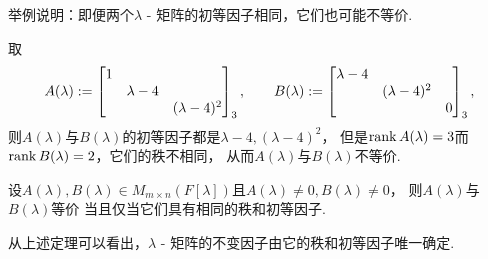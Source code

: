 \begin{example}
举例说明：即便两个\(\lambda\) - 矩阵的初等因子相同，它们也可能不等价.
\begin{solution}
取\begin{equation*}
	A(\lambda)
	:=
	\begin{bmatrix}
		1 \\
		& \lambda-4 \\
		&& (\lambda-4)^2 \\
	\end{bmatrix}_3,
	\qquad
	B(\lambda)
	:=
	\begin{bmatrix}
		\lambda-4 \\
		& (\lambda-4)^2 \\
		&& 0 \\
	\end{bmatrix}_3,
\end{equation*}
则\(A(\lambda)\)与\(B(\lambda)\)的初等因子都是\(\lambda-4,(\lambda-4)^2\)，
但是\(\rank A(\lambda) = 3\)而\(\rank B(\lambda) = 2\)，它们的秩不相同，
从而\(A(\lambda)\)与\(B(\lambda)\)不等价.
\end{solution}
\end{example}

\begin{theorem}
设\(A(\lambda), B(\lambda) \in M_{m \times n}(F[\lambda])\)且\(A(\lambda) \neq 0, B(\lambda) \neq 0\)，
则\(A(\lambda)\)与\(B(\lambda)\)等价
当且仅当它们具有相同的秩和初等因子.
\end{theorem}
\begin{remark}
从上述定理可以看出，\(\lambda\) - 矩阵的不变因子由它的秩和初等因子唯一确定.
\end{remark}

